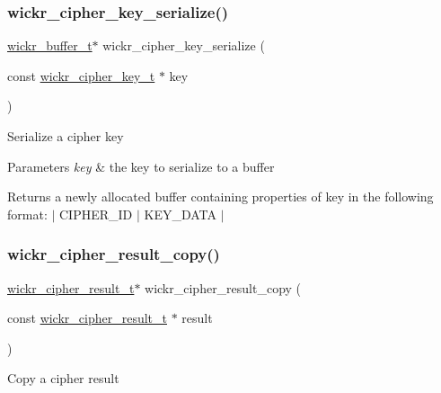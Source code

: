 \subsubsection{\texorpdfstring{wickr\+\_\+cipher\+\_\+key\+\_\+serialize()}{wickr\_cipher\_key\_serialize()}}
{\footnotesize\ttfamily \hyperlink{structwickr__buffer}{wickr\+\_\+buffer\+\_\+t}$\ast$ wickr\+\_\+cipher\+\_\+key\+\_\+serialize (\begin{DoxyParamCaption}\item[{const \hyperlink{structwickr__cipher__key}{wickr\+\_\+cipher\+\_\+key\+\_\+t} $\ast$}]{key }\end{DoxyParamCaption})}

Serialize a cipher key


\begin{DoxyParams}{Parameters}
{\em key} & the key to serialize to a buffer \\
\hline
\end{DoxyParams}
\begin{DoxyReturn}{Returns}
a newly allocated buffer containing properties of \textquotesingle{}key\textquotesingle{} in the following format\+: $\vert$ C\+I\+P\+H\+E\+R\+\_\+\+ID $\vert$ K\+E\+Y\+\_\+\+D\+A\+TA $\vert$ 
\end{DoxyReturn}
\mbox{\label{group__wickr__cipher_gace82050fcc8b7932df9a9e8109a2fc1d}} 
\subsubsection{\texorpdfstring{wickr\+\_\+cipher\+\_\+result\+\_\+copy()}{wickr\_cipher\_result\_copy()}}
{\footnotesize\ttfamily \hyperlink{structwickr__cipher__result}{wickr\+\_\+cipher\+\_\+result\+\_\+t}$\ast$ wickr\+\_\+cipher\+\_\+result\+\_\+copy (\begin{DoxyParamCaption}\item[{const \hyperlink{structwickr__cipher__result}{wickr\+\_\+cipher\+\_\+result\+\_\+t} $\ast$}]{result }\end{DoxyParamCaption})}

Copy a cipher result


